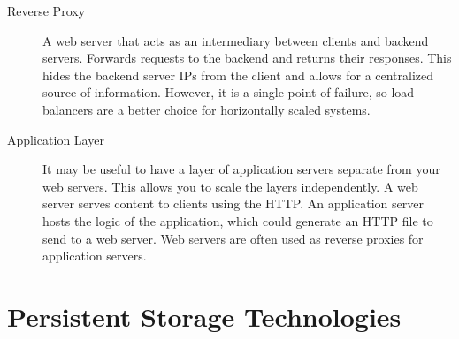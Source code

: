 \begin{description}
    \item[Reverse Proxy] A web server that acts as an intermediary between clients and backend servers. Forwards requests to the backend and returns their responses. This hides the backend server IPs from the client and allows for a centralized source of information. However, it is a single point of failure, so load balancers are a better choice for horizontally scaled systems.
		
    \item[Application Layer] It may be useful to have a layer of application servers separate from your web servers. This allows you to scale the layers independently. A web server serves content to clients using the HTTP. An application server hosts the logic of the application, which could generate an HTTP file to send to a web server. Web servers are often used as reverse proxies for application servers.
\end{description}

\section{Persistent Storage Technologies}

